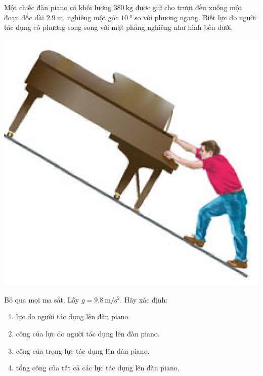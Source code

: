 \begin{ex}
Một chiếc đàn piano có khối lượng $\SI{380}{\kilogram}$ được giữ cho trượt đều xuống một đoạn dốc dài $\SI{2.9}{\meter}$, nghiêng một góc $\SI{10}{\degree}$ so với phương ngang. Biết lực do người tác dụng có phương song song với mặt phẳng nghiêng như hình bên dưới. 
\begin{center}
	\includegraphics[width=0.35\linewidth]{../figs/VN10-2023-PH-TP024-P-4}
\end{center}
Bỏ qua mọi ma sát. Lấy $g=\SI{9.8}{\meter/\second^2}$. Hãy xác định:
\begin{enumerate}[label=\alph*)]
	\item lực do người tác dụng lên đàn piano.
	\item công của lực do người tác dụng lên đàn piano.
	\item công của trọng lực tác dụng lên đàn piano.
	\item tổng công của tất cả các lực tác dụng lên đàn piano.
\end{enumerate}
\end{ex}
